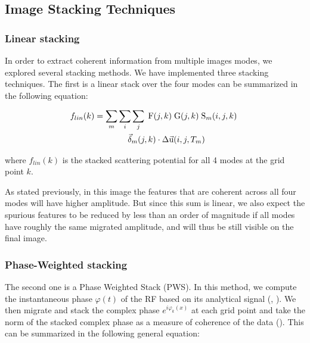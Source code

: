 \documentclass[10pt,a4paper]{article}
\numberwithin{equation}{section}
\begin{document}
\subsection{Image Stacking Techniques}

\subsubsection{Linear stacking}

In order to extract coherent information from multiple images modes, we explored several stacking methods.
We have implemented three stacking techniques.
The first is a linear stack over the four modes can be summarized in the following equation:

\begin{align}
  f_{lin}(k) &= \sum_m \sum_i \sum_j \; \text{F}(j,k) \; \text{G}(j,k) \; \text{S}_{m}(i,j,k) \; \notag\\&\qquad\qquad \vec{\delta}_{m}(j,k) \cdot \Delta\vec{\text{u}}(i,j,T_m)
  \label{lin}
\end{align}
\vspace{1mm}

\noindent where $f_{lin}(k)$ is the stacked scattering potential for all 4 modes at the grid point $k$. 

As stated previously, in this image the features that are coherent across all four modes will have higher amplitude.
But since this sum is linear, we also expect the spurious features to be reduced by less than an order of magnitude if all modes have roughly the same migrated amplitude, and will thus be still visible on the final image.

\subsubsection{Phase-Weighted stacking}

The second one is a Phase Weighted Stack (PWS).
In this method, we compute the instantaneous phase $\varphi(t)$ of the RF based on its analytical signal (\cite{schi_gji_97}, \cite{cost_gphy_18}).
We then migrate and stack the complex phase $e^{i\varphi_k(x)}$ at each grid point and take the norm of the stacked complex phase as a measure of coherence of the data (\cite{coop_saga_07}).
This can be summarized in the following general equation:
\end{document}
